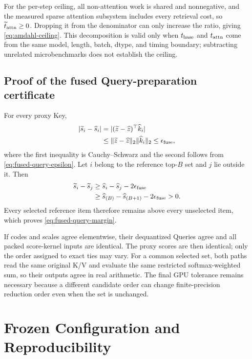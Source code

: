 For the per-step ceiling, all non-attention work is shared and nonnegative,
and the measured sparse attention subsystem includes every retrieval cost,
so $\widetilde t_{\rm attn}\ge0$.  Dropping it from the denominator can only
increase the ratio, giving \cref{eq:amdahl-ceiling}.  This decomposition is
valid only when $t_{\rm base}$ and $t_{\rm attn}$ come from the same model,
length, batch, dtype, and timing boundary; subtracting unrelated
microbenchmarks does not establish the ceiling.

\subsection{Proof of the fused Query-preparation certificate}

For every proxy Key,
\begin{align}
 |\widetilde s_i-\widehat s_i|
 &=
 |(\widetilde z-\widehat z)^\top\widehat k_i| \\
 &\le
 \|\widetilde z-\widehat z\|_2\|\widehat k_i\|_2
 \le\epsilon_{\rm fuse},
\end{align}
where the first inequality is Cauchy--Schwarz and the second follows from
\cref{eq:fused-query-epsilon}.
Let $i$ belong to the reference top-$B$ set and $j$ lie outside it.  Then
\begin{align}
 \widetilde s_i-\widetilde s_j
 &\ge
 \widehat s_i-\widehat s_j-2\epsilon_{\rm fuse}\\
 &\ge
 \widehat s_{(B)}-\widehat s_{(B+1)}
 -2\epsilon_{\rm fuse}>0.
\end{align}
Every selected reference item therefore remains above every unselected item,
which proves \cref{eq:fused-query-margin}.

If codes and scales agree elementwise, their dequantized Queries agree and
all packed score-kernel inputs are identical.  The proxy scores are then
identical; only the order assigned to exact ties may vary.
For a common selected set, both paths read the same original K/V and evaluate
the same restricted softmax-weighted sum, so their outputs agree in real
arithmetic.  The final GPU tolerance remains necessary because a different
candidate order can change finite-precision reduction order even when the set
is unchanged.

\section{Frozen Configuration and Reproducibility}
\label{app:repro}

